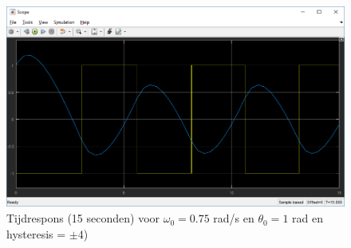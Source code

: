 \documentclass[12pt]{article}
\begin{document}
\begin{figure}[]
	\centering
	\includegraphics[width=\textwidth, keepaspectratio]{output2.png}
	\caption{Tijdrespons (15 seconden) voor $\omega_0 = 0.75$ rad/s en $\theta_0 = 1$ rad en hysteresis = $\pm 4$)}
	\label{output2}
\end{figure}
\end{document}
